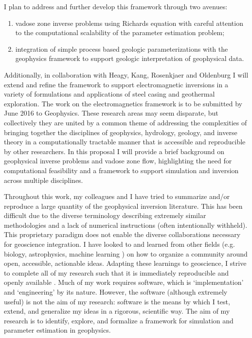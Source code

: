 \documentclass[11pt]{article}
\begin{document}
I plan to address and further develop this framework through two avenues:
\begin{enumerate}
\item vadose zone inverse problems using Richards equation with careful attention to the computational scalability of the parameter estimation problem;
\item integration of simple process based geologic parameterizations with the geophysics framework to support geologic interpretation of geophysical data.
\end{enumerate}
Additionally, in collaboration with Heagy, Kang, Rosenkjaer and Oldenburg I will extend and refine the framework to support electromagnetic inversions in a variety of formulations and applications of steel casing and geothermal exploration. The work on the electromagnetics framework is to be submitted by June 2016 to Geophysics. These research areas may seem disparate, but collectively they are united by a common theme of addressing the complexities of bringing together the disciplines of geophysics, hydrology, geology, and inverse theory in a computationally tractable manner that is accessible and reproducible by other researchers. In this proposal I will provide a brief background on geophysical inverse problems and vadose zone flow, highlighting the need for computational feasibility and a framework to support simulation and inversion across multiple disciplines.

Throughout this work, my colleagues and I have tried to summarize and/or reproduce a large quantity of the geophysical inversion literature. This has been difficult due to the diverse terminology describing extremely similar methodologies and a lack of numerical instructions (often intentionally withheld). This proprietary paradigm does not enable the diverse collaborations necessary for geoscience integration. I have looked to and learned from other fields (e.g. biology, astrophysics, machine learning  \cite{Astropy,scikit-learn}) on how to organize a community around open, accessible, actionable ideas. Adapting these learnings to geoscience, I strive to complete all of my research such that it is immediately reproducible and openly available \citep{Cockett2015c,Wilson2014, RTFD, Travis, Coveralls}. Much of my work requires software, which is `implementation' and `engineering' by its nature. However, the software (although extremely useful) is not the aim of my research: software is the means by which I test, extend, and generalize my ideas in a rigorous, scientific way. The aim of my research is to identify, explore, and formalize a framework for simulation and parameter estimation in geophysics.
\end{document}
